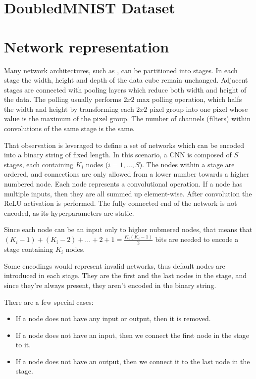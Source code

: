 \documentclass[eng]{simposium}
\begin{document}
\section{DoubledMNIST Dataset}

\section{Network representation}
\label{sec:repr}

Many network architectures, such as \cite{6,7}, can be partitioned into stages.
In each stage the width, height and depth of the data cube remain unchanged. 
Adjacent stages are connected with pooling layers which reduce both width and height of the data.
The polling usually performs $2 x 2$ max polling operation, which halfs the width and height by transforming each $2 x 2$ 
pixel group into one pixel whose value is the maximum of the pixel group.
The number of channels (filters) within convolutions of the same stage is the same.

That observation is leveraged to define a set of networks which 
can be encoded into a binary string of fixed length.
In this scenario, a CNN is composed of $S$ stages, each containing 
$K_i$ nodes ($i=1,...,S$). 
The nodes within a stage are ordered, and connections are only allowed from a lower number towards a higher numbered node.
Each node represents a convolutional operation. If a node has multiple inputs, then they are all summed up element-wise.
After convolution the ReLU activation is performed. 
The fully connected end of the network is not encoded, as its hyperparameters are static.

Since each node can be an input only to higher nubmered nodes, that means that 
$(K_i -1) + (K_i - 2) + ... + 2 + 1 = \frac{K_i(K_i-1)}{2} $ bits are needed to encode a stage containing $K_i$ nodes.

Some encodings would represent invalid networks, thus default nodes are introduced in each stage.
They are the first and the last nodes in the stage, and since they're always present, they aren't encoded in the binary string.

There are a few special cases:
\begin{itemize}
    \item If a node does not have any input or output, then it is removed.
    \item If a node does not have an input, then we connect the first node in the stage to it.
    \item If a node does not have an output, then we connect it to the last node in the stage.
\end{itemize}
\end{document}
